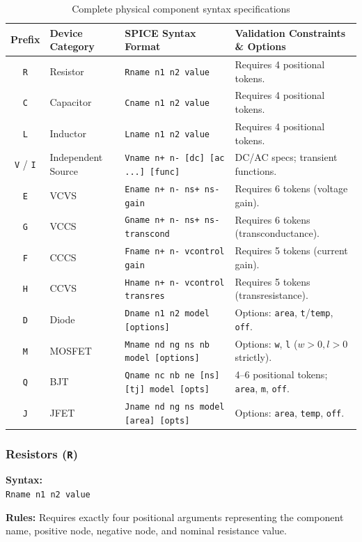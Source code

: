 \begin{table}[H]
\centering
\small
\begin{tabular}{|c|l|p{4.2cm}|p{4.5cm}|}
\hline
\textbf{Prefix} & \textbf{Device Category} & \textbf{SPICE Syntax Format} & \textbf{Validation Constraints \& Options} \\
\hline
\texttt{R} & Resistor & \texttt{Rname n1 n2 value} & Requires 4 positional tokens. \\
\hline
\texttt{C} & Capacitor & \texttt{Cname n1 n2 value} & Requires 4 positional tokens. \\
\hline
\texttt{L} & Inductor & \texttt{Lname n1 n2 value} & Requires 4 positional tokens. \\
\hline
\texttt{V} / \texttt{I} & Independent Source & \texttt{Vname n+ n- [dc] [ac ...] [func]} & DC/AC specs; transient functions. \\
\hline
\texttt{E} & VCVS & \texttt{Ename n+ n- ns+ ns- gain} & Requires 6 tokens (voltage gain). \\
\hline
\texttt{G} & VCCS & \texttt{Gname n+ n- ns+ ns- transcond} & Requires 6 tokens (transconductance). \\
\hline
\texttt{F} & CCCS & \texttt{Fname n+ n- vcontrol gain} & Requires 5 tokens (current gain). \\
\hline
\texttt{H} & CCVS & \texttt{Hname n+ n- vcontrol transres} & Requires 5 tokens (transresistance). \\
\hline
\texttt{D} & Diode & \texttt{Dname n1 n2 model [options]} & Options: \texttt{area}, \texttt{t}/\texttt{temp}, \texttt{off}. \\
\hline
\texttt{M} & MOSFET & \texttt{Mname nd ng ns nb model [options]} & Options: \texttt{w}, \texttt{l} ($w>0, l>0$ strictly). \\
\hline
\texttt{Q} & BJT & \texttt{Qname nc nb ne [ns] [tj] model [opts]} & 4--6 positional tokens; \texttt{area}, \texttt{m}, \texttt{off}. \\
\hline
\texttt{J} & JFET & \texttt{Jname nd ng ns model [area] [opts]} & Options: \texttt{area}, \texttt{temp}, \texttt{off}. \\
\hline
\end{tabular}
\caption{Complete physical component syntax specifications}
\label{tab:component_syntax_complete}
\end{table}

\subsubsection{Resistors (\texttt{R})}
\begin{compactitem}
    \item \textbf{Syntax:} \\
    \texttt{Rname n1 n2 value}
    \item \textbf{Rules:} Requires exactly four positional arguments representing the component name, positive node, negative node, and nominal resistance value.
\end{compactitem}

